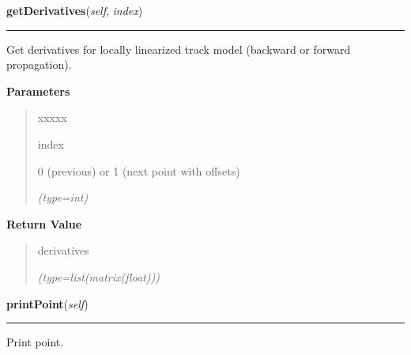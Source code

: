 \hspace{.8\funcindent}\begin{boxedminipage}{\funcwidth}

    \raggedright \textbf{getDerivatives}(\textit{self}, \textit{index})

    \vspace{-1.5ex}

    \rule{\textwidth}{0.5\fboxrule}
\setlength{\parskip}{2ex}
    Get derivatives for locally linearized track model (backward or forward
    propagation).

\setlength{\parskip}{1ex}
      \textbf{Parameters}
      \vspace{-1ex}

      \begin{quote}
        \begin{Ventry}{xxxxx}

          \item[index]

          0 (previous) or 1 (next point with offsets)

            {\it (type=int)}

        \end{Ventry}

      \end{quote}

      \textbf{Return Value}
    \vspace{-1ex}

      \begin{quote}
      derivatives

      {\it (type=list(matrix(float)))}

      \end{quote}

    \end{boxedminipage}

    \label{gblfit:GblPoint:printPoint}

    \vspace{0.5ex}

\hspace{.8\funcindent}\begin{boxedminipage}{\funcwidth}

    \raggedright \textbf{printPoint}(\textit{self})

    \vspace{-1.5ex}

    \rule{\textwidth}{0.5\fboxrule}
\setlength{\parskip}{2ex}
    Print point.

\setlength{\parskip}{1ex}
    \end{boxedminipage}


